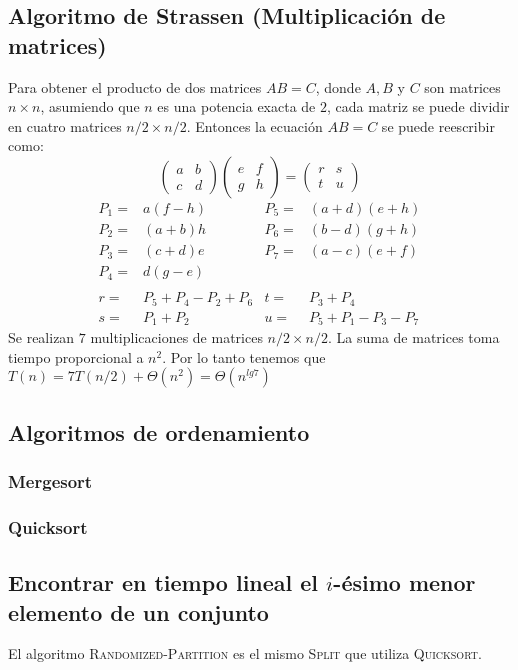 \begin{multicols}{2}
\subsection{Algoritmo de Strassen (Multiplicaci\'on de matrices)}
Para obtener el producto de dos matrices $AB=C$, donde $A,B$ y $C$ son matrices $n\times n$, asumiendo que $n$ es una potencia exacta de $2$, cada matriz se puede dividir en cuatro matrices $n/2\times n/2$. Entonces la ecuaci\'on $AB=C$ se puede reescribir como:
\[
\begin{pmatrix}
  a & b \\
  c & d
\end{pmatrix}
\begin{pmatrix}
  e & f \\
  g & h
\end{pmatrix}
=
\begin{pmatrix}
  r & s \\
  t & u
\end{pmatrix}
\]
\begin{align*}
P_1 = & a(f-h) & P_5 = & (a+d)(e+h) \\
P_2 = & (a+b)h & P_6 = & (b-d)(g+h) \\
P_3 = & (c+d)e & P_7 = & (a-c)(e+f) \\
P_4 = & d(g-e) & \\ \\
r = & P_5+P_4-P_2+P_6 & t = & P_3+P_4 \\
s = & P_1+P_2 & u = & P_5+P_1-P_3-P_7
\end{align*}
Se realizan $7$ multiplicaciones de matrices $n/2\times n/2$. La suma de matrices toma tiempo proporcional a $n^2$. Por lo tanto tenemos que $T(n)=7T(n/2)+\Theta(n^2)=\Theta(n^{lg7})$
\end{multicols}
\pagebreak
\subsection{Algoritmos de ordenamiento}
	\subsubsection{Mergesort}
	\pagebreak
	\subsubsection{Quicksort}
\pagebreak
\subsection{Encontrar en tiempo lineal el $i$-\'esimo menor elemento de un conjunto}
	El algoritmo \textsc{Randomized-Partition} es el mismo \textsc{Split} que utiliza \textsc{Quicksort}.
